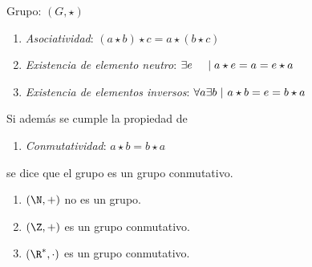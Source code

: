 \documentclass[10pt,t]{beamer}
\begin{document}
\begin{frame}%
    \begin{block}{\centering \large Grupo: $(G,\star)$}
        \begin{enumerate}[label=\roman*)]
            \item \textit{Asociatividad}: \hspace{9em}
                $(a \star b) \star c = a \star (b \star c)$
            \item \textit{Existencia de elemento neutro}: \hspace{1.7em}
                $\exists e \hspace{1.12em} \mid  a \star e = a = e \star a$
            \item \textit{Existencia de elementos inversos}: \hspace{0.6em}
                $\forall a \exists b \mid \hspace{0.1em} a \star b  = e = b \star a$
        \end{enumerate}
        Si además se cumple la propiedad de
        \begin{enumerate}[label=iv)]
            \item \textit{Conmutatividad}: \hspace{8.4em}
            $a \star b  = b \star a$
        \end{enumerate}
        se dice que el grupo es un \alert{grupo conmutativo}.
    \end{block} 

    \begin{plainexample}
        \begin{enumerate}[label=--]
            \item $(\N,+)$ no es un grupo.
            \item $(\Z,+)$ es un grupo conmutativo.
            \item $(\R^*,\cdot)$ es un grupo conmutativo.
        \end{enumerate}
    \end{plainexample}
\end{frame}
\end{document}
